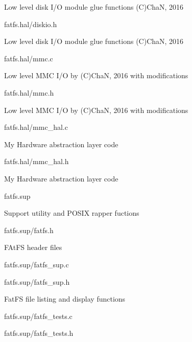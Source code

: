 \begin{DoxyItemize}
\begin{DoxyItemize}
\begin{DoxyItemize}
\item Low level disk I/O module glue functions (C)ChaN, 2016
\end{DoxyItemize}
\item fatfs.\+hal/diskio.h
\begin{DoxyItemize}
\item Low level disk I/O module glue functions (C)ChaN, 2016
\end{DoxyItemize}
\item fatfs.\+hal/mmc.c
\begin{DoxyItemize}
\item Low level M\+MC I/O by (C)ChaN, 2016 with modifications
\end{DoxyItemize}
\item fatfs.\+hal/mmc.h
\begin{DoxyItemize}
\item Low level M\+MC I/O by (C)ChaN, 2016 with modifications
\end{DoxyItemize}
\item fatfs.\+hal/mmc\+\_\+hal.c
\begin{DoxyItemize}
\item My Hardware abstraction layer code
\end{DoxyItemize}
\item fatfs.\+hal/mmc\+\_\+hal.h
\begin{DoxyItemize}
\item My Hardware abstraction layer code
\end{DoxyItemize}
\end{DoxyItemize}
\item fatfs.\+sup
\begin{DoxyItemize}
\item Support utility and P\+O\+S\+IX rapper fuctions
\item fatfs.\+sup/fatfs.h
\begin{DoxyItemize}
\item F\+At\+FS header files
\end{DoxyItemize}
\item fatfs.\+sup/fatfs\+\_\+sup.c
\item fatfs.\+sup/fatfs\+\_\+sup.h
\begin{DoxyItemize}
\item Fat\+FS file listing and display functions
\end{DoxyItemize}
\item fatfs.\+sup/fatfs\+\_\+tests.c
\item fatfs.\+sup/fatfs\+\_\+tests.h

\end{DoxyItemize}
\end{DoxyItemize}
